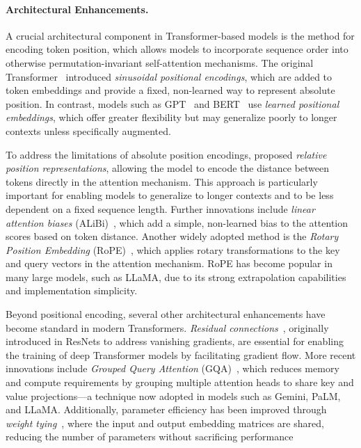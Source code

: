 \paragraph{Architectural Enhancements.}
A crucial architectural component in Transformer-based models is the method for encoding token position, which allows models to incorporate sequence order into otherwise permutation-invariant self-attention mechanisms. The original Transformer~\citep{vaswani2017attention} introduced \emph{sinusoidal positional encodings}, which are added to token embeddings and provide a fixed, non-learned way to represent absolute position. In contrast, models such as GPT~\citep{radford2018gpt1} and BERT~\citep{devlin2019bert} use \emph{learned positional embeddings}, which offer greater flexibility but may generalize poorly to longer contexts unless specifically augmented.

To address the limitations of absolute position encodings, \citet{shaw2018self} proposed \emph{relative position representations}, allowing the model to encode the distance between tokens directly in the attention mechanism. This approach is particularly important for enabling models to generalize to longer contexts and to be less dependent on a fixed sequence length. Further innovations include \emph{linear attention biases} (ALiBi)~\citep{press2021train}, which add a simple, non-learned bias to the attention scores based on token distance. Another widely adopted method is the \emph{Rotary Position Embedding} (RoPE)~\citep{su2024rope}, which applies rotary transformations to the key and query vectors in the attention mechanism. RoPE has become popular in many large models, such as LLaMA, due to its strong extrapolation capabilities and implementation simplicity.

Beyond positional encoding, several other architectural enhancements have become standard in modern Transformers. \emph{Residual connections}~\citep{he2016deep}, originally introduced in ResNets to address vanishing gradients, are essential for enabling the training of deep Transformer models by facilitating gradient flow. More recent innovations include \emph{Grouped Query Attention} (GQA)~\citep{ainslie2023gqa}, which reduces memory and compute requirements by grouping multiple attention heads to share key and value projections—a technique now adopted in models such as Gemini, PaLM, and LLaMA. Additionally, parameter efficiency has been improved through \emph{weight tying}~\citep{press2017using}, where the input and output embedding matrices are shared, reducing the number of parameters without sacrificing performance

